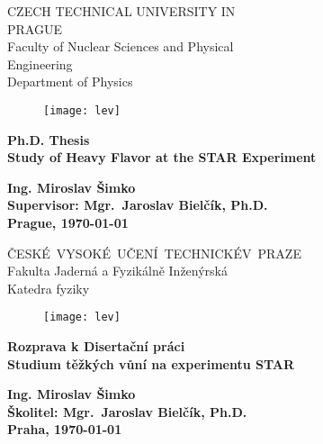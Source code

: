 \documentclass[a4paper,titlepage,11pt,twoside,openright]{report} %
\newcommand{\myself}{Ing. Miroslav Šimko}
\newcommand{\engtitle}{Study of Heavy Flavor at the STAR Experiment}
\newcommand{\czechtitle}{Studium těžkých vůní na experimentu STAR}
\newcommand{\skolitel}{Mgr.\ Jaroslav Bielčík, Ph.D.}
\begin{document}
\thispagestyle{empty}
\setcounter{page}{1}
\begin{center}
    {\LARGE \textsc CZECH TECHNICAL UNIVERSITY IN \\[0.3cm]PRAGUE}\\[2ex]
    {\LARGE \textsc Faculty of Nuclear Sciences and Physical \\[0.2cm]Engineering}\\[2ex]
    {\LARGE \textsc Department of Physics}\\
    \vspace{1cm}
    \begin{figure}[ht!]
    \begin{center}
      {\texttt{[image: lev]}}
    \end{center}
    \end{figure}
    \vspace{1cm}

    {\textbf {\Huge Ph.D. Thesis \\[4ex]}
    {\LARGE \bf \engtitle} 
    }

    \vfill

    {\Large \bf \myself }\\ [4ex]
    {\large \bf  Supervisor: \skolitel}\\[4ex]
    {\Large \bf Prague, \justyear\today}\\
    \newpage \rule{0pt}{2cm}
\end{center}
\thispagestyle{empty}
\begin{center}
    {\LARGE \textsc \mbox{\v{C}ESK\' E VYSOKÉ U\v CEN\' I TECHNICK\' E \\[0.3cm]V PRAZE}}\\[2ex]
    {\LARGE \textsc Fakulta Jadern\' a a Fyzik\' aln\v e In\v zen\' yrsk\' a}\\[2ex]
    {\LARGE \textsc Katedra fyziky}\\
    \vspace{1cm}
    \begin{figure}[ht!]
    \begin{center}
      {\texttt{[image: lev]}}
    \end{center}
    \end{figure}
    \vspace{1cm}

    {\textbf {\Huge Rozprava k Diserta\v cn\' i pr\' aci \\[4ex]}
    {\LARGE \bf \czechtitle} 
    }

    \vfill

    {\Large \bf \myself }\\ [4ex]
    {\large \bf Školitel: \skolitel}\\[4ex]
    {\Large \bf Praha, \justyear\today}\\
    \newpage \rule{0pt}{2cm}
\end{center}
\end{document}
